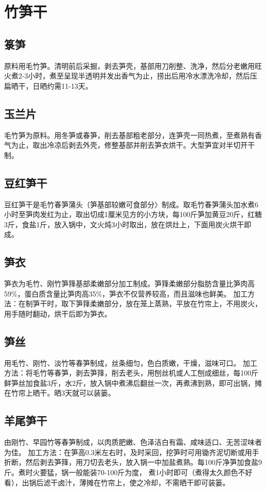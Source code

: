 \documentclass{ctexbook}
\begin{document}
\section{竹笋干}
\subsection{箓笋}
原料用毛竹笋。清明前后采掘，剥去笋壳，基部用刀削整、洗净，然后分老嫩用旺火煮2-3小时，煮至呈现半透明并发出香气为止，捞出后用冷水漂洗冷却，然后压扁晒干，日晒约需11-13天。
\subsection{玉兰片}
毛竹笋为原料。用冬笋或春笋，削去基部粗老部分，连笋壳一同热煮，至煮熟有香气为止，取出冷凉后剥去外壳，修整基部并削去笋衣烘干。大型笋宜对半切开干制。
\subsection{豆红笋干}
豆红笋干是毛竹春笋蒲头（笋基部较嫩可食部分〉制成。取毛竹春笋蒲头加水煮6小时至笋肉发红为止，取出切成1厘米见方的小方块，每100斤笋加黄豆20斤，红糖3斤，食盐1斤，放入锅中，文火炖3小时取出，放在烘灶上，下面用炭火烘干即成。
\subsection{笋衣}
笋衣为毛竹、刚竹笋箨基部柔嫩部分加工制成。笋箨柔嫩部分脂肪含量比笋肉高59\%，蛋白质含量比笋肉高35\%，笋衣不仅营养较高，而且滋味也鲜美。
加工方法：在制笋干时，取下笋箨柔嫩部分，放在笼上蒸熟，平放在竹帘上，不用炭火，用手随时翻动，烘干后即为笋衣。
\subsection{笋丝}
用毛竹、刚竹、淡竹等春笋制成，丝条细匀，色白质嫩，干燥，滋味可口。
加工方法：将毛竹等春笋，剥去笋箨，削去老头，用刨丝机或人工刨成细丝，每100斤鲜笋丝加食盐3斤，水2斤，放入锅中煮沸后翻丝一次，再煮沸到熟，即可出锅，摊在竹帘上晒干。晒3天就可以装篓。
\subsection{羊尾笋干}
由刚竹、早园竹等春笋制成，以肉质肥嫩、色泽洁白有霜、咸味适口、无苦涩味者为佳。
加工方法：在笋高0.3米左右时，及时采回，挖笋时可用锄齐泥切断或用手折断，然后剥去笋箨，用刀切去老头，放入锅一中加盐煮熟。每100斤净笋加食盐9斤。煮时火要猛，锅一般能装70-100斤为度，
煮1小时即可（煮得太久颜色不好看），出锅后滤干卤汁，薄摊在竹帘上，使之冷却，不需晒干即可装篓。
\end{document}
